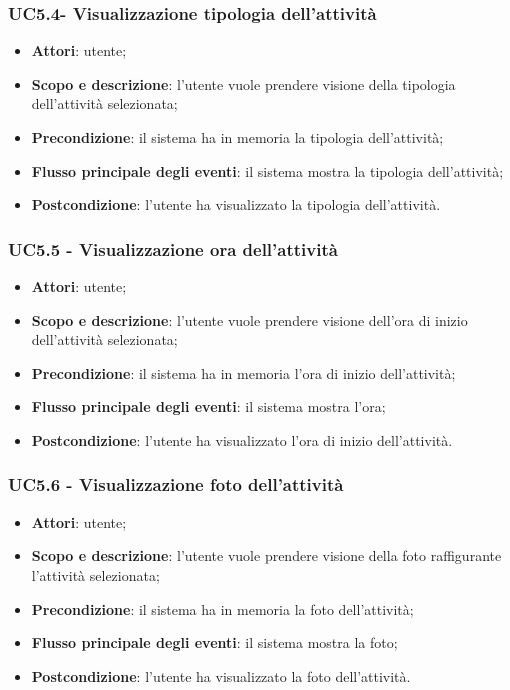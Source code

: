 \subsubsection{UC5.4- Visualizzazione tipologia dell’attività }
\begin{itemize}
	\item \textbf{Attori}: utente;
	\item \textbf{Scopo e descrizione}: l’utente vuole prendere visione della tipologia dell’attività selezionata;
	\item \textbf{Precondizione}: il sistema ha in memoria la tipologia dell’attività;
	\item \textbf{Flusso principale degli eventi}: il sistema mostra la tipologia dell’attività;
	\item \textbf{Postcondizione}: l’utente ha visualizzato la tipologia dell’attività.
\end{itemize}

\subsubsection{UC5.5 - Visualizzazione ora dell’attività }
\begin{itemize}
	\item \textbf{Attori}: utente;
	\item \textbf{Scopo e descrizione}: l’utente vuole prendere visione dell'ora di inizio dell'attività selezionata;
	\item \textbf{Precondizione}: il sistema ha in memoria l'ora di inizio dell'attività;
	\item \textbf{Flusso principale degli eventi}: il sistema mostra l'ora;
	\item \textbf{Postcondizione}: l’utente ha visualizzato l'ora di inizio dell’attività.
\end{itemize}

\subsubsection{UC5.6 - Visualizzazione foto dell’attività }
\begin{itemize}
	\item \textbf{Attori}: utente;
	\item \textbf{Scopo e descrizione}: l’utente vuole prendere visione della foto raffigurante l'attività selezionata;
	\item \textbf{Precondizione}: il sistema ha in memoria la foto dell'attività;
	\item \textbf{Flusso principale degli eventi}: il sistema mostra la foto;
	\item \textbf{Postcondizione}: l’utente ha visualizzato la foto dell’attività.
\end{itemize}

